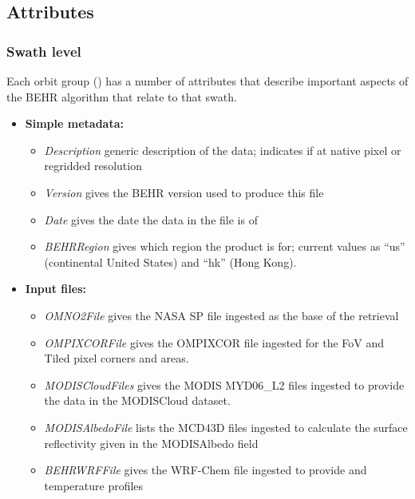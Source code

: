 \documentclass[12pt]{article}
\begin{document}
\subsection{Attributes}
\subsubsection{Swath level}
	Each orbit group () has a number of attributes that describe important aspects of the BEHR algorithm that relate to that swath.
	
	\begin{itemize}
	\item \textbf{Simple metadata:}
		\begin{itemize}
		\item \emph{Description} generic description of the data; indicates if at native pixel or regridded resolution
		\item \emph{Version} gives the BEHR version used to produce this file
		\item \emph{Date} gives the date the data in the file is of
		
		\item \emph{BEHRRegion} gives which region the product is for; current values as ``us'' (continental United States) and ``hk'' (Hong Kong).
		\end{itemize}
		
	\item \textbf{Input files:}
		\begin{itemize}
		\item \emph{OMNO2File} gives the NASA SP file ingested as the base of the retrieval
		\item \emph{OMPIXCORFile} gives the OMPIXCOR file ingested for the FoV and Tiled pixel corners and areas.
		\item \emph{MODISCloudFiles} gives the MODIS MYD06\_L2 files ingested to provide the data in the MODISCloud dataset.
		\item \emph{MODISAlbedoFile} lists the MCD43D files ingested to calculate the surface reflectivity given in the MODISAlbedo field
		\item \emph{BEHRWRFFile} gives the WRF-Chem file ingested to provide  and temperature profiles
		\end{itemize}
		

\end{itemize}
\end{document}
